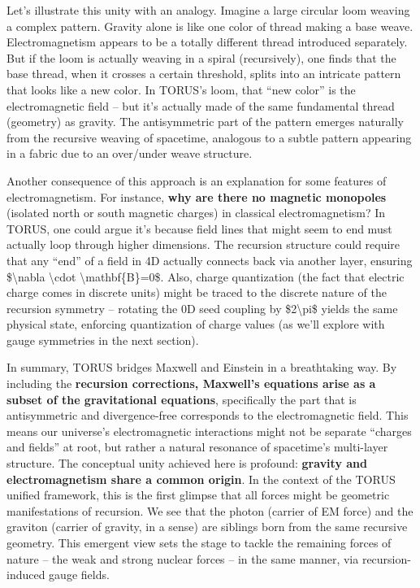 \documentclass[
]{article}
\begin{document}
{Let's illustrate this unity with an analogy. Imagine a large circular
loom weaving a complex pattern. Gravity alone is like one color of
thread making a base weave. Electromagnetism appears to be a totally
different thread introduced separately. But if the loom is actually
weaving in a spiral (recursively), one finds that the base thread, when
it crosses a certain threshold, splits into an intricate pattern that
looks like a new color. In TORUS's loom, that ``new color'' is the
electromagnetic field -- but it's actually made of the same fundamental
thread (geometry) as gravity. The antisymmetric part of the pattern
emerges naturally from the recursive weaving of spacetime, analogous to
a subtle pattern appearing in a fabric due to an over/under weave
structure.

Another consequence of this approach is an explanation for some features
of electromagnetism. For instance, \textbf{why are there no magnetic
monopoles} (isolated north or south magnetic charges) in classical
electromagnetism? In TORUS, one could argue it's because field lines
that might seem to end must actually loop through higher dimensions. The
recursion structure could require that any ``end'' of a field in 4D
actually connects back via another layer, ensuring
\$\textbackslash nabla \textbackslash cdot
\textbackslash mathbf\{B\}=0\$\hspace{0pt}. Also, charge quantization
(the fact that electric charge comes in discrete units) might be traced
to the discrete nature of the recursion symmetry -- rotating the 0D seed
coupling by \$2\textbackslash pi\$ yields the same physical state,
enforcing quantization of charge values (as we'll explore with gauge
symmetries in the next section).

In summary, TORUS bridges Maxwell and Einstein in a breathtaking way. By
including the \textbf{recursion corrections, Maxwell's equations arise
as a subset of the gravitational equations}, specifically the part that
is antisymmetric and divergence-free corresponds to the electromagnetic
field. This means our universe's electromagnetic interactions might not
be separate ``charges and fields'' at root, but rather a natural
resonance of spacetime's multi-layer structure. The conceptual unity
achieved here is profound: \textbf{gravity and electromagnetism share a
common origin}. In the context of the TORUS unified framework, this is
the first glimpse that all forces might be geometric manifestations of
recursion. We see that the photon (carrier of EM force) and the graviton
(carrier of gravity, in a sense) are siblings born from the same
recursive geometry. This emergent view sets the stage to tackle the
remaining forces of nature -- the weak and strong nuclear forces -- in
the same manner, via recursion-induced gauge fields.

}
\end{document}
